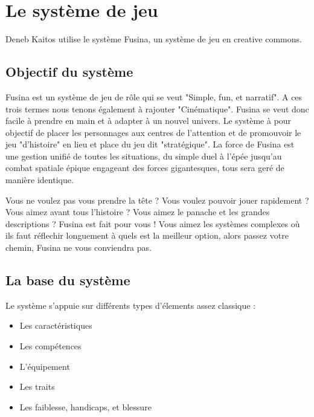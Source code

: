 \documentclass{DenebClass}
\begin{document}
\chapter{Le système de jeu}

\begin{multicols}{2}

Deneb Kaitos utilise le système Fusina, un système de jeu en creative commons.

\section{Objectif du système}

Fusina est un système de jeu de rôle qui se veut "Simple, fun, et narratif". A ces trois termes nous tenons également à rajouter "Cinématique". Fusina se veut donc facile à prendre en main et à adapter à un nouvel univers. Le système à pour objectif de placer les personnages aux centres de l'attention et de promouvoir le jeu "d'histoire" en lieu et place du jeu dit "stratégique". La force de Fusina est une gestion unifié de toutes les situations, du simple duel à l'épée jusqu'au combat spatiale épique engageant des forces gigantesques, tous sera geré de manière identique. 

Vous ne voulez pas vous prendre la tête ? Vous voulez pouvoir jouer rapidement ? Vous aimez avant tous l'histoire ? Vous aimez le panache et les grandes descriptions ? Fusina est fait pour vous ! Vous aimez les systèmes complexes où ils faut réflechir longuement à quels est la meilleur option, alors passez votre chemin, Fusina ne vous conviendra pas.

\section{La base du système}

Le système s'appuie sur différents types d'élements assez classique :

\begin{itemize}
\item Les caractéristiques
\item Les compétences
\item L'équipement
\item Les traits
\item Les faiblesse, handicaps, et blessure
\end{itemize}


\end{multicols}
\end{document}
